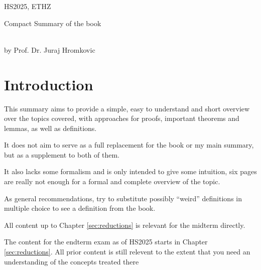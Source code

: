 \documentclass{article}
\begin{document}
\vspace{2cm}
\begin{center}
    HS2025, ETHZ\\[0.2cm]
    \begin{Large}
        Compact Summary of the book \color{MidnightBlue}\color{black}
    \end{Large}\\[0.2cm]
    by Prof. Dr. Juraj Hromkovic
\end{center}


\newpage
{}
\section{Introduction}
This summary aims to provide a simple, easy to understand and short overview over the topics covered, with approaches for proofs, important theorems and lemmas,
as well as definitions.

It does not aim to serve as a full replacement for the book or my main summary, but as a supplement to both of them.

It also lacks some formalism and is only intended to give some intuition, six pages are really not enough for a formal and complete overview of the topic.

As general recommendations, try to substitute possibly ``weird'' definitions in multiple choice to see a definition from the book.

All content up to Chapter \ref{sec:reductions} is relevant for the midterm directly.

The content for the endterm exam as of HS2025 starts in Chapter \ref{sec:reductions}.
All prior content is still relevent to the extent that you need an understanding of the concepts treated there









\end{document}
